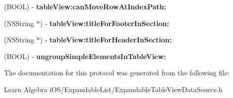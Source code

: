 \begin{DoxyCompactItemize}
\item 
\hypertarget{protocol_expandable_table_view_data_source-p_a207002f87eb1bf920d43a71775d74455}{(B\-O\-O\-L) -\/ {\bfseries table\-View\-:can\-Move\-Row\-At\-Index\-Path\-:}}\label{protocol_expandable_table_view_data_source-p_a207002f87eb1bf920d43a71775d74455}

\item 
\hypertarget{protocol_expandable_table_view_data_source-p_a9294b92cdebb642b90b6dddcb5292e0f}{(N\-S\-String $\ast$) -\/ {\bfseries table\-View\-:title\-For\-Footer\-In\-Section\-:}}\label{protocol_expandable_table_view_data_source-p_a9294b92cdebb642b90b6dddcb5292e0f}

\item 
\hypertarget{protocol_expandable_table_view_data_source-p_a251a07431d414d884fa722b620c7dab7}{(N\-S\-String $\ast$) -\/ {\bfseries table\-View\-:title\-For\-Header\-In\-Section\-:}}\label{protocol_expandable_table_view_data_source-p_a251a07431d414d884fa722b620c7dab7}

\item 
\hypertarget{protocol_expandable_table_view_data_source-p_a63d8b868ec03d2407f70bc2cfaaaa046}{(B\-O\-O\-L) -\/ {\bfseries ungroup\-Simple\-Elements\-In\-Table\-View\-:}}\label{protocol_expandable_table_view_data_source-p_a63d8b868ec03d2407f70bc2cfaaaa046}

\end{DoxyCompactItemize}


The documentation for this protocol was generated from the following file\-:\begin{DoxyCompactItemize}
\item 
Learn Algebra i\-O\-S/\-Expandable\-List/Expandable\-Table\-View\-Data\-Source.\-h\end{DoxyCompactItemize}
